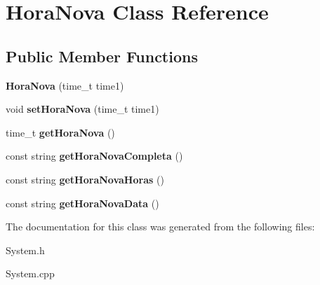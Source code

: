 \hypertarget{class_hora_nova}{}\section{Hora\+Nova Class Reference}
\label{class_hora_nova}
\subsection*{Public Member Functions}
\begin{DoxyCompactItemize}
\item 
\hypertarget{class_hora_nova_ab82cb8096c2e5c244206378f304e88be}{}{\bfseries Hora\+Nova} (time\+\_\+t time1)\label{class_hora_nova_ab82cb8096c2e5c244206378f304e88be}

\item 
\hypertarget{class_hora_nova_adef600287f7aa3001ee40be141a5810b}{}void {\bfseries set\+Hora\+Nova} (time\+\_\+t time1)\label{class_hora_nova_adef600287f7aa3001ee40be141a5810b}

\item 
\hypertarget{class_hora_nova_a3d613dbe2b24e2c8c02571ff24c983a8}{}time\+\_\+t {\bfseries get\+Hora\+Nova} ()\label{class_hora_nova_a3d613dbe2b24e2c8c02571ff24c983a8}

\item 
\hypertarget{class_hora_nova_adb109871ead648de0f79b479bf89a64b}{}const string {\bfseries get\+Hora\+Nova\+Completa} ()\label{class_hora_nova_adb109871ead648de0f79b479bf89a64b}

\item 
\hypertarget{class_hora_nova_a20518cf8e04847c487634d36a76ba455}{}const string {\bfseries get\+Hora\+Nova\+Horas} ()\label{class_hora_nova_a20518cf8e04847c487634d36a76ba455}

\item 
\hypertarget{class_hora_nova_a40043280cc8a4f8f301542ccaaa22578}{}const string {\bfseries get\+Hora\+Nova\+Data} ()\label{class_hora_nova_a40043280cc8a4f8f301542ccaaa22578}

\end{DoxyCompactItemize}


The documentation for this class was generated from the following files\+:\begin{DoxyCompactItemize}
\item 
System.\+h\item 
System.\+cpp\end{DoxyCompactItemize}
